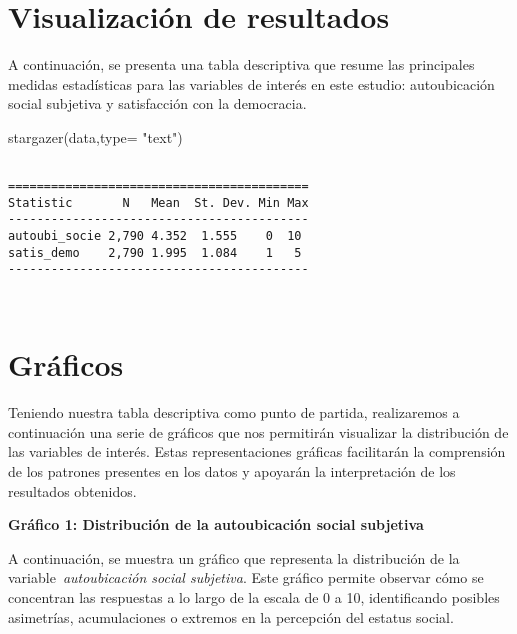 \documentclass[
  11pt,
]{article}
\newenvironment{Shaded}{\begin{snugshade}}{\end{snugshade}}
\newcommand{\AttributeTok}[1]{\textcolor[rgb]{0.40,0.45,0.13}{#1}}
\newcommand{\FunctionTok}[1]{\textcolor[rgb]{0.28,0.35,0.67}{#1}}
\newcommand{\NormalTok}[1]{\textcolor[rgb]{0.00,0.23,0.31}{#1}}
\newcommand{\StringTok}[1]{\textcolor[rgb]{0.13,0.47,0.30}{#1}}
\begin{document}
\hypertarget{visualizaciuxf3n-de-resultados}{%
\section{Visualización de
resultados}\label{visualizaciuxf3n-de-resultados}}

A continuación, se presenta una tabla descriptiva que resume las
principales medidas estadísticas para las variables de interés en este
estudio: autoubicación social subjetiva y satisfacción con la
democracia.

\begin{Shaded}
\begin{Highlighting}[]
\FunctionTok{stargazer}\NormalTok{(data,}\AttributeTok{type=} \StringTok{"text"}\NormalTok{)}
\end{Highlighting}
\end{Shaded}

\begin{verbatim}

==========================================
Statistic       N   Mean  St. Dev. Min Max
------------------------------------------
autoubi_socie 2,790 4.352  1.555    0  10 
satis_demo    2,790 1.995  1.084    1   5 
------------------------------------------
\end{verbatim}

\begin{verbatim}
\end{verbatim}

\begin{verbatim}
\end{verbatim}

\hypertarget{gruxe1ficos}{%
\section{Gráficos}\label{gruxe1ficos}}

Teniendo nuestra tabla descriptiva como punto de partida, realizaremos a
continuación una serie de gráficos que nos permitirán visualizar la
distribución de las variables de interés. Estas representaciones
gráficas facilitarán la comprensión de los patrones presentes en los
datos y apoyarán la interpretación de los resultados obtenidos.

\textbf{Gráfico 1: Distribución de la autoubicación social subjetiva}

A continuación, se muestra un gráfico que representa la distribución de
la variable~\emph{autoubicación social subjetiva}. Este gráfico permite
observar cómo se concentran las respuestas a lo largo de la escala de 0
a 10, identificando posibles asimetrías, acumulaciones o extremos en la
percepción del estatus social.
\end{document}
